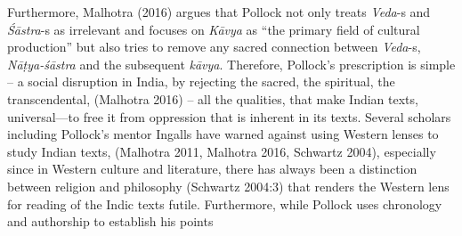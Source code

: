 Furthermore, Malhotra (2016) argues that Pollock not only treats \textsl{Veda}-s and \textsl{Śāstra}-s as irrelevant and focuses on \textsl{Kāvya} as “the primary field of cultural production” but also tries to remove any sacred connection between \textsl{Veda}-s, \textsl{Nāṭya-śāstra} and the subsequent \textsl{kāvya}. Therefore, Pollock’s prescription is simple -- a social disruption in India, by rejecting the sacred, the spiritual, the transcendental, (Malhotra 2016) -- all the qualities, that make Indian texts, universal---to free it from oppression that is inherent in its texts. Several scholars including Pollock’s mentor Ingalls have warned against using Western lenses to study Indian texts, (Malhotra 2011, Malhotra 2016, Schwartz 2004), especially since in Western culture and literature, there has always been a distinction between religion and philosophy (Schwartz 2004:3) that renders the Western lens for reading of the Indic texts futile. Furthermore, while Pollock uses chronology and authorship to establish his points
